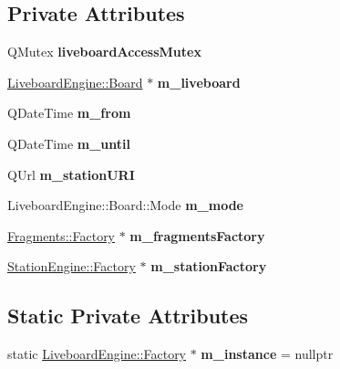 \subsection*{Private Attributes}
\begin{DoxyCompactItemize}
\item 
\mbox{\label{classLiveboardEngine_1_1Factory_a0bbd9cca03d43800f5d4621d1685fbb1}} 
Q\+Mutex {\bfseries liveboard\+Access\+Mutex}
\item 
\mbox{\label{classLiveboardEngine_1_1Factory_ab0c26a56e06ae85f336d57c3cf65c840}} 
\mbox{\hyperlink{classLiveboardEngine_1_1Board}{Liveboard\+Engine\+::\+Board}} $\ast$ {\bfseries m\+\_\+liveboard}
\item 
\mbox{\label{classLiveboardEngine_1_1Factory_a431320530f78df90fbfab06fb9a19fe1}} 
Q\+Date\+Time {\bfseries m\+\_\+from}
\item 
\mbox{\label{classLiveboardEngine_1_1Factory_a784255d4b92213d1a6d3defe68a0e576}} 
Q\+Date\+Time {\bfseries m\+\_\+until}
\item 
\mbox{\label{classLiveboardEngine_1_1Factory_a65ba0fc99dc4a73eefcce0cc65db2f8e}} 
Q\+Url {\bfseries m\+\_\+station\+U\+RI}
\item 
\mbox{\label{classLiveboardEngine_1_1Factory_a76adf5433e6da144ff3b7dd6749ff0c4}} 
Liveboard\+Engine\+::\+Board\+::\+Mode {\bfseries m\+\_\+mode}
\item 
\mbox{\label{classLiveboardEngine_1_1Factory_afeb512b65d2c46c3e7b037725a6b7fa4}} 
\mbox{\hyperlink{classFragments_1_1Factory}{Fragments\+::\+Factory}} $\ast$ {\bfseries m\+\_\+fragments\+Factory}
\item 
\mbox{\label{classLiveboardEngine_1_1Factory_afddd77a02b368c8147180d7b88a22135}} 
\mbox{\hyperlink{classStationEngine_1_1Factory}{Station\+Engine\+::\+Factory}} $\ast$ {\bfseries m\+\_\+station\+Factory}
\end{DoxyCompactItemize}
\subsection*{Static Private Attributes}
\begin{DoxyCompactItemize}
\item 
\mbox{\label{classLiveboardEngine_1_1Factory_ad5a5c61d1196a8f7433b7e2b8e41ca64}} 
static \mbox{\hyperlink{classLiveboardEngine_1_1Factory}{Liveboard\+Engine\+::\+Factory}} $\ast$ {\bfseries m\+\_\+instance} = nullptr
\end{DoxyCompactItemize}


